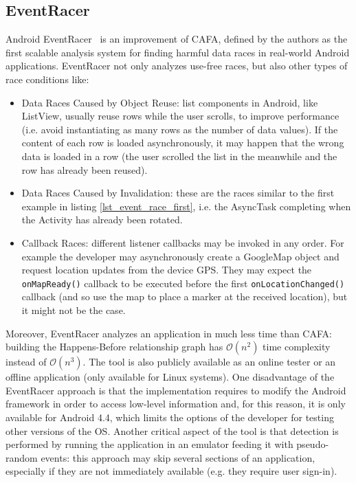 \documentclass[11pt,a4paper,notitlepage]{article}
\begin{document}
\subsection{EventRacer}
Android EventRacer~\cite{Bielik:2015:SRD:2858965.2814303} is an improvement of CAFA, defined by the authors as the first scalable analysis system for finding harmful data races in real-world Android applications. EventRacer not only analyzes use-free races, but also other types of race conditions like:
\begin{itemize}
	\item Data Races Caused by Object Reuse: list components in Android, like ListView, usually reuse rows while the user scrolls, to improve performance (i.e. avoid instantiating as many rows as the number of data values). If the content of each row is loaded asynchronously, it may happen that the wrong data is loaded in a row (the user scrolled the list in the meanwhile and the row has already been reused).
	\item Data Races Caused by Invalidation: these are the races similar to the first example in listing \ref{lst_event_race_first}, i.e. the AsyncTask completing when the Activity has already been rotated.
	\item Callback Races: different listener callbacks may be invoked in any order. For example the developer may asynchronously create a GoogleMap object and request location updates from the device GPS. They may expect the \texttt{onMapReady()} callback to be executed before the first \texttt{onLocationChanged()} callback (and so use the map to place a marker at the received location), but it might not be the case.
\end{itemize}
Moreover, EventRacer analyzes an application in much less time than CAFA: building the Happens-Before relationship graph has $\mathcal{O}(n^2)$ time complexity instead of $\mathcal{O}(n^3)$. The tool is also publicly available as an online tester or an offline application (only available for Linux systems). One disadvantage of the EventRacer approach is that the implementation requires to modify the Android framework in order to access low-level information and, for this reason, it is only available for Android 4.4, which limits the options of the developer for testing other versions of the OS. Another critical aspect of the tool is that detection is performed by running the application in an emulator feeding it with pseudo-random events: this approach may skip several sections of an application, especially if they are not immediately available (e.g. they require user sign-in).
\end{document}
